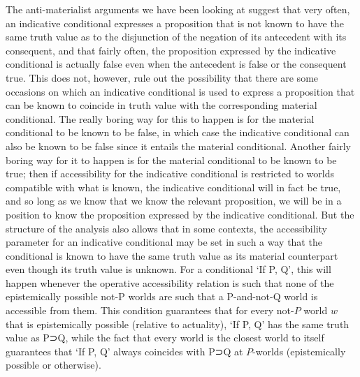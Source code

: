 \documentclass[If.tex]{subfiles}
\begin{document}
The anti-materialist arguments we have been looking at suggest that very often, an indicative conditional expresses a proposition that is not known to have the same truth value as to the disjunction of the negation of its antecedent with its consequent, and that fairly often, the proposition expressed by the indicative conditional is actually false even when the antecedent is false or the consequent true.  This does not, however, rule out the possibility that there are some occasions on which an indicative conditional is used to express a proposition that can be known to coincide in truth value with the corresponding material conditional.  The really boring way for this to happen is for the material conditional to be known to be false, in which case the indicative conditional can also be known to be false since it entails the material conditional.  Another fairly boring way for it to happen is for the material conditional to be known to be true; then if accessibility for the indicative conditional is restricted to worlds compatible with what is known, the indicative conditional will in fact be true, and so long as we know that we know the relevant proposition, we will be in a position to know the proposition expressed by the indicative conditional.  But the structure of the analysis also allows that in some contexts, the accessibility parameter for an indicative conditional may be set in such a way that the conditional is known to have the same truth value as its material counterpart even though its truth value is unknown.  For a conditional ‘If P, Q’, this will happen whenever the operative accessibility relation is such that none of the epistemically possible not-P worlds are such that a P-and-not-Q world is accessible from them.  This condition guarantees that for every not-$P$ world $w$ that is epistemically possible (relative to actuality), ‘If P, Q’ has the same truth value as P⊃Q, while the fact that every world is the closest world to itself guarantees that ‘If P, Q’ always coincides with P⊃Q at $P$-worlds (epistemically possible or otherwise).  
\end{document}

